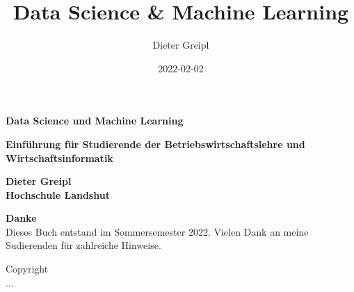 \documentclass[
  oneside]{book}
\title{Data Science \& Machine Learning}
\author{Dieter Greipl}
\date{2022-02-02}
\begin{document}
\maketitle


\begin{titlepage}

\begin{center}

\Huge \textbf{Data Science und Machine Learning}

\Large \textbf{Einführung für Studierende der Betriebswirtschaftslehre und Wirtschaftsinformatik}


\end{center}

\noindent{}

\vspace{-3cm}
\hfill
\begin{minipage}[b][1cm][t]{10cm}
  \color{white}
  \begin{flushright}
     \Huge\textbf{Dieter Greipl}\\
     \Large\textbf{Hochschule Landshut}\\
  \end{flushright}
\end{minipage}

\end{titlepage}

\begin{titlepage}
\hfill
\begin{minipage}[r][10cm][t]{10cm}
\large \textbf{Danke}\\
	Dieses Buch entstand im Sommersemester 2022. Vielen Dank an meine Sudierenden für zahlreiche Hinweise.
\end{minipage}

\vfill
\begin{minipage}[b][10cm][b]{10cm}
\large{Copyright}\\
	...
\end{minipage}

\end{titlepage}
\end{document}

